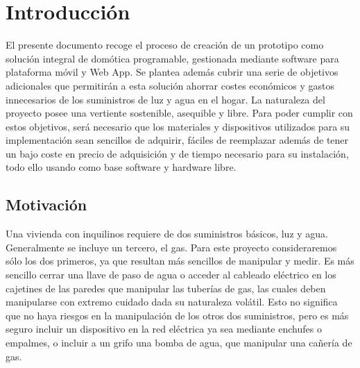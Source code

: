 \cleardoublepage

\chapter{Introducción}

\label{makereference}
El presente documento recoge el proceso de creación de un prototipo como solución integral de domótica programable, gestionada mediante software para plataforma móvil y Web App. Se plantea además cubrir una serie de objetivos adicionales que permitirán a esta solución ahorrar costes económicos y gastos innecesarios de los suministros de luz y agua en el hogar. La naturaleza del proyecto posee una vertiente sostenible, asequible y libre. Para poder cumplir con estos objetivos, será necesario que los materiales y dispositivos utilizados para su implementación sean sencillos de adquirir, fáciles de reemplazar además de tener un bajo coste en precio de adquisición y de tiempo necesario para su instalación, todo ello usando como base software y hardware libre.

\section{Motivación}
\label{makereference1.1}

Una vivienda con inquilinos requiere de dos suministros básicos, luz y agua. Generalmente se incluye un tercero, el gas. Para este proyecto consideraremos sólo los dos primeros, ya que resultan más sencillos de manipular y medir. Es más sencillo cerrar una llave de paso de agua o acceder al cableado eléctrico en los cajetines de las paredes que manipular las tuberías de gas, las cuales deben manipularse con extremo cuidado dada su naturaleza volátil. Esto no significa que no haya riesgos en la manipulación de los otros dos suministros, pero es más seguro incluir un dispositivo en la red eléctrica ya sea mediante enchufes o empalmes, o incluir a un grifo una bomba de agua, que manipular una cañería de gas.

